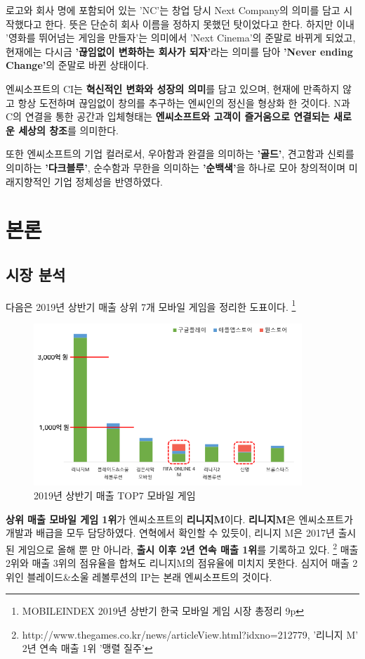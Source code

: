 \documentclass[11pt]{oblivoir}
\begin{document}
			로고와 회사 명에 포함되어 있는 'NC'는 창업 당시 Next Company의 의미를 담고 시작했다고 한다. 뜻은 단순히 회사 이름을 정하지 못했던 탓이었다고 한다. 하지만 이내 '영화를 뛰어넘는 게임을 만들자'는 의미에서 'Next Cinema'의 준말로 바뀌게 되었고, 현재에는 다시금 \textbf{'끊임없이 변화하는 회사가 되자'}라는 의미를 담아 \textbf{'Never ending Change'}의 준말로 바뀐 상태이다.
			
			엔씨소프트의 CI는 \textbf{혁신적인 변화와 성장의 의미}를 담고 있으며, 현재에 만족하지 않고 항상 도전하며 끊임없이 창의를 추구하는 엔씨인의 정신을 형상화 한 것이다. N과 C의 연결을 통한 공간과 입체형태는 \textbf{엔씨소프트와 고객이 즐거움으로 연결되는 새로운 세상의 창조}를 의미한다.
			
			또한 엔씨소프트의 기업 컬러로서, 우아함과 완결을 의미하는 \textbf{'골드'}, 견고함과 신뢰를 의미하는 \textbf{'다크블루'}, 순수함과 무한을 의미하는 \textbf{'순백색'}을 하나로 모아 창의적이며 미래지향적인 기업 정체성을 반영하였다.
			
	\section{본론}
		\subsection{시장 분석}
		\noindent
		다음은 2019년 상반기 매출 상위 7개 모바일 게임을 정리한 도표이다.  \footnote{MOBILEINDEX 2019년 상반기 한국 모바일 게임 시장 총정리 9p}
		\begin{figure}[htbp]
			\centering
			\includegraphics[width=0.9\textwidth]{Pictures/Sangbangi.png}
			\caption{2019년 상반기 매출 TOP7 모바일 게임}
		\end{figure}
		
		\textbf{상위 매출 모바일 게임 1위}가 엔씨소프트의 \textbf{리니지M}이다. \textbf{리니지M}은 엔씨소프트가 개발과 배급을 모두 담당하였다. 연혁에서 확인할 수 있듯이, 리니지 M은 2017년 출시된 게임으로 올해 뿐 만 아니라, \textbf{출시 이후 2년 연속 매출 1위}를 기록하고 있다.
		\footnote{http://www.thegames.co.kr/news/articleView.html?idxno=212779, '리니지 M' 2년 연속 매출 1위 '맹렬 질주'}
		매출 2위와 매출 3위의 점유율을 합쳐도 리니지M의 점유율에 미치지 못한다. 심지어 매출 2위인 블레이드\&소울 레볼루션의 IP는 본래 엔씨소프트의 것이다.
		
\end{document}
